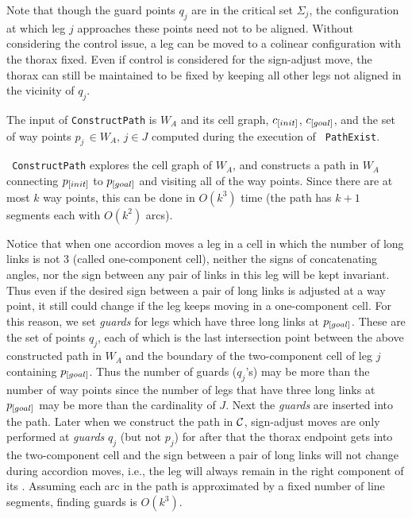 Note that though the guard points $q_j$ are in the critical set
$\Sigma_j$, the configuration at which leg $j$ approaches these
points need not to be aligned. Without considering the control
issue, a leg can be moved to a colinear configuration with the
thorax fixed. Even if control is considered for the sign-adjust
move, the thorax can still be maintained to be fixed by keeping
all other legs not aligned in the vicinity of $q_j$.

The input of {\tt ConstructPath} is $W_A$ and its cell graph,
$c_{\textit{\rm{[}}init]}$, $c_{\textit{\rm{[}}goal]}$, and the set of way points
$p_{j}\, \in W_A, \, j\in J$ computed during the execution of {\tt
PathExist}.

\noindent {} {\tt
ConstructPath} explores the cell graph of $W_A$, and constructs a
path in $W_A$ connecting $p_{\textit{\rm{[}}init]}$ to $p_{\textit{\rm{[}}goal]}$
and visiting all of the way points. Since there are at most $k$
way points, this can be done in $O(k^3)$ time (the path has $k+1$
segments each with $O(k^2)$ arcs).

\noindent {} Notice that when one accordion moves a leg
in a cell in which the number of long links is not $3$ (called
one-component cell), neither the signs of concatenating angles,
nor the sign between any pair of links in this leg will be kept
invariant. Thus even if the desired sign between a pair of long
links is adjusted at a way point, it still could change if the leg
keeps moving in a one-component cell. For this reason, we set {\em
guards} for legs which have three long links at $p_{\textit{\rm{[}}goal]}$.
These are the set of points $q_j$, each of which is the last
intersection point between the above constructed path in $W_A$ and
the boundary of the two-component cell of leg $j$ containing
$p_{\textit{\rm{[}}goal]}$. Thus the number of guards ($q_j$'s) may be more
than the number of way points since the number of legs that have
three long links at $p_{\textit{\rm{[}}goal]}$ may be more than the
cardinality of $J$. Next the {\em guards} are inserted into the
path. Later when we construct the path in ${\cal C}$, sign-adjust
moves are only performed at {\em guards} $q_j$ (but not $p_j$) for
after that the thorax endpoint gets into the two-component cell
and the sign between a pair of long links will not change during
accordion moves, i.e., the leg will always remain in the right
component of its \cspace.  Assuming each arc in the path is
approximated by a fixed number of line segments, finding guards is
$O(k^3)$.


